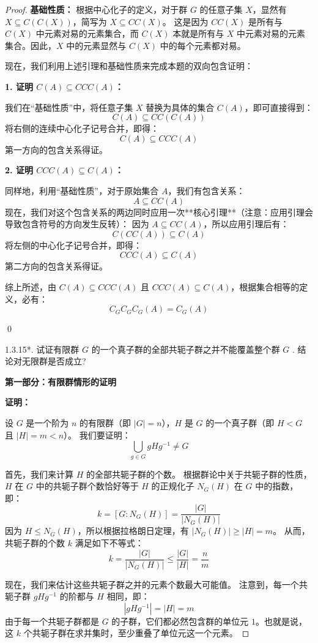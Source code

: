 \documentclass[]{article}
\begin{document}
\begin{proof}
\bigskip
\noindent \textbf{基础性质：} 
根据中心化子的定义，对于群 $G$ 的任意子集 $X$，显然有 $X \subseteq C(C(X))$，简写为 $X \subseteq CC(X)$。
这是因为 $CC(X)$ 是所有与 $C(X)$ 中元素对易的元素集合，而 $C(X)$ 本就是所有与 $X$ 中元素对易的元素集合。因此，$X$ 中的元素显然与 $C(X)$ 中的每个元素都对易。

\bigskip
现在，我们利用上述引理和基础性质来完成本题的双向包含证明：

\bigskip
\noindent \textbf{1. 证明 $C(A) \subseteq CCC(A)$：}

我们在“基础性质”中，将任意子集 $X$ 替换为具体的集合 $C(A)$，即可直接得到：
\[ C(A) \subseteq CC(C(A)) \]
将右侧的连续中心化子记号合并，即得：
\[ C(A) \subseteq CCC(A) \]
第一方向的包含关系得证。

\bigskip
\noindent \textbf{2. 证明 $CCC(A) \subseteq C(A)$：}

同样地，利用“基础性质”，对于原始集合 $A$，我们有包含关系：
\[ A \subseteq CC(A) \]
现在，我们对这个包含关系的两边同时应用一次**核心引理**（注意：应用引理会导致包含符号的方向发生反转）：
因为 $A \subseteq CC(A)$，所以应用引理后有：
\[ C(CC(A)) \subseteq C(A) \]
将左侧的中心化子记号合并，即得：
\[ CCC(A) \subseteq C(A) \]
第二方向的包含关系得证。

\bigskip
综上所述，由 $C(A) \subseteq CCC(A)$ 且 $CCC(A) \subseteq C(A)$，根据集合相等的定义，必有：
\[ C_G C_G C_G(A) = C_G(A) \]

\qed

1.3.15*. 试证有限群 $G$ 的一个真子群的全部共轭子群之并不能覆盖整个群 $G$ . 结论对无限群是否成立? 

\bigskip
\noindent \textbf{第一部分：有限群情形的证明}

\medskip
\noindent \textbf{证明：} 

设 $G$ 是一个阶为 $n$ 的有限群（即 $|G| = n$），$H$ 是 $G$ 的一个真子群（即 $H < G$ 且 $|H| = m < n$）。
我们要证明：
\[ \bigcup_{g \in G} gHg^{-1} \neq G \]

首先，我们来计算 $H$ 的全部共轭子群的个数。
根据群论中关于共轭子群的性质，$H$ 在 $G$ 中的共轭子群个数恰好等于 $H$ 的正规化子 $N_G(H)$ 在 $G$ 中的指数，即：
\[ k = [G : N_G(H)] = \frac{|G|}{|N_G(H)|} \]
因为 $H \leqslant N_G(H)$，所以根据拉格朗日定理，有 $|N_G(H)| \ge |H| = m$。
从而，共轭子群的个数 $k$ 满足如下不等式：
\[ k = \frac{|G|}{|N_G(H)|} \le \frac{|G|}{|H|} = \frac{n}{m} \]

现在，我们来估计这些共轭子群之并的元素个数最大可能值。
注意到，每一个共轭子群 $gHg^{-1}$ 的阶都与 $H$ 相同，即：
\[ |gHg^{-1}| = |H| = m \]
由于每一个共轭子群都是 $G$ 的子群，它们都必然包含群的单位元 $1$。也就是说，这 $k$ 个共轭子群在求并集时，至少重叠了单位元这一个元素。


\end{proof}
\end{document}
